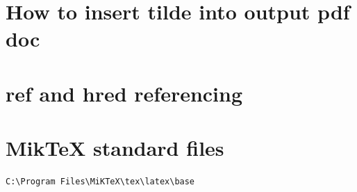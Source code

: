 \section{How to insert tilde into output pdf doc}
\fbox{\textcolor{red}{To be implemented}}
\section{ref and hred referencing}
\fbox{\textcolor{red}{To be implemented}}
\section{MikTeX standard files}
\fbox{\textcolor{red}{To be implemented}}
\begin{verbatim}
C:\Program Files\MiKTeX\tex\latex\base
\end{verbatim}